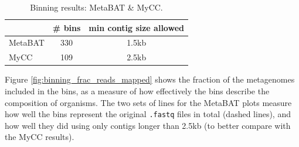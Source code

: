 \begin{table}[H]
\centering
\begin{singlespace}
\caption[Binning results: MetaBAT \& MyCC]
	{Binning results: MetaBAT \& MyCC.}
\label{table:sample_read_sizes}
\begin{tabular}{l | cc}
            & \# bins &  min contig size allowed \\  %
\midrule
	MetaBAT & 330   & 1.5kb \\
	MyCC    & 109   & 2.5kb \\


\end{tabular}
\end{singlespace}
\end{table}

Figure \ref{fig:binning_frac_reads_mapped} shows the fraction of the metagenomes included in the bins, as a measure of how effectively the bins describe the composition of organisms.
The two sets of lines for the MetaBAT plots measure how well the bins represent the original \texttt{.fastq} files in total (dashed lines), and how well they did using only contigs longer than 2.5kb (to better compare with the MyCC results).

